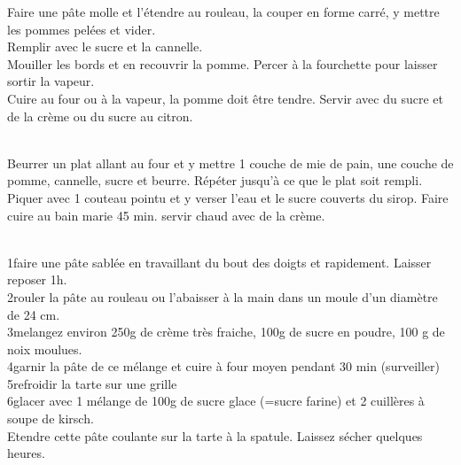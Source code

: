 \begin{minipage}[c]{\textwidth}
Faire une pâte molle et l'étendre au rouleau, la couper en forme carré, y mettre les pommes pelées et vider.\\
Remplir avec le sucre et la cannelle.\\
Mouiller les bords et en recouvrir la pomme. Percer à la fourchette pour laisser sortir la vapeur.\\
Cuire au four ou à la vapeur, la pomme doit être tendre. Servir avec du sucre et de la crème ou du sucre au citron. \\
\\

\end{minipage}

\begin{minipage}[c]{\textwidth}
Beurrer un plat allant au four et y mettre 1 couche de mie de pain, une couche de pomme, cannelle, sucre et beurre. Répéter jusqu'à ce que le plat soit rempli. Piquer avec 1 couteau pointu  et y verser l'eau et le sucre couverts du sirop. Faire cuire au bain marie 45 min. servir chaud avec de la crème.\\
\\

\end{minipage}

\begin{minipage}[c]{\textwidth}
1\degrees faire une pâte sablée en travaillant du bout des doigts et rapidement. Laisser reposer 1h.\\
2\degrees rouler la pâte au rouleau ou l'abaisser à la main dans un moule d'un diamètre de 24 cm.\\
3\degrees melangez environ 250g de crème très fraiche, 100g de sucre en poudre, 100 g de noix moulues.\\
4\degrees garnir la pâte de ce mélange et cuire à four moyen pendant 30 min (surveiller)\\
5\degrees refroidir la tarte sur une grille\\
6\degrees glacer avec 1 mélange de 100g de sucre glace (=sucre farine) et 2 cuillères à soupe de kirsch. \\
Etendre cette pâte coulante sur la tarte à la spatule. Laissez sécher quelques heures.\\
\\

\end{minipage}


